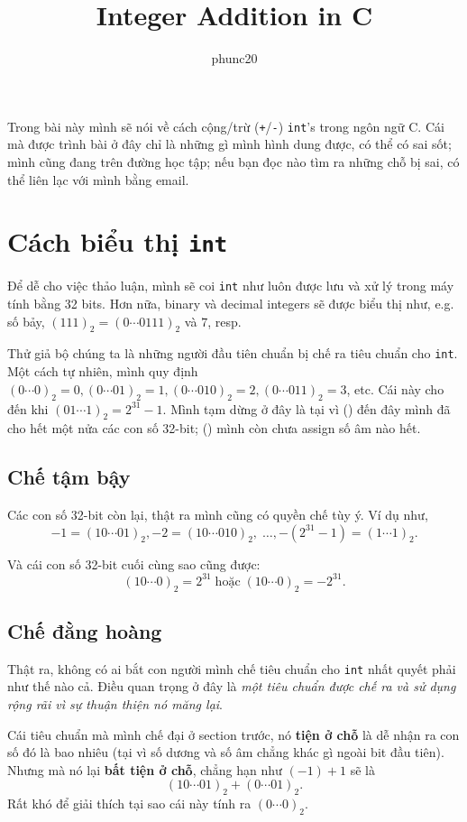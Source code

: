 \documentclass{article}
\author{phunc20}
\title{Integer Addition in C}
\begin{document}
\maketitle
Trong bài này mình sẽ nói về cách cộng/trừ (\texttt{+}/\texttt{-}) \texttt{int}'s trong ngôn ngữ C. Cái mà được trình bài ở đây chỉ là những gì mình hình dung được, có thể có sai sốt; mình cũng đang trên đường học tập; nếu bạn đọc nào tìm ra những chỗ bị sai, có thể liên lạc với mình bằng email.

\section{Cách biểu thị \texttt{int}}
Để dễ cho việc thảo luận, mình sẽ coi \texttt{int} như luôn được lưu và xử lý trong máy tính bằng 32 bits. Hơn nữa, binary và decimal integers sẽ được biểu thị như, e.g. số bảy, $(111)_{2} = (0\cdots0111)_{2}$ và $7$, resp.

Thử giả bộ chúng ta là những người đầu tiên chuẩn bị chế ra tiêu chuẩn cho \texttt{int}.
Một cách tự nhiên, mình quy định $(0\cdots0)_{2} = 0, (0\cdots01)_{2} = 1, (0\cdots010)_{2} = 2, (0\cdots011)_{2} = 3$, etc. Cái này cho đến khi $(01\cdots1)_{2} = 2^{31} - 1$. Mình tạm dừng ở đây là tại vì () đến đây mình đã cho hết một nửa các con số 32-bit; () mình còn chưa assign số âm nào hết.
\subsection{Chế tậm bậy}
Các con số 32-bit còn lại, thật ra mình cũng có quyền chế tùy ý. Ví dụ như, 
$$-1 = (10\cdots01)_{2}, -2 = (10\cdots010)_{2},\;\ldots, -(2^{31} - 1) = (1\cdots1)_{2}.$$

Và cái con số 32-bit cuối cùng sao cũng được:
$$(10\cdots0)_{2} = 2^{31} \;\textrm{hoặc}\; (10\cdots0)_{2} = -2^{31}.$$

\subsection{Chế đằng hoàng}
Thật ra, không có ai bắt con người mình chế tiêu chuẩn cho \texttt{int} nhất quyết phải như thế nào cả. Điều quan trọng ở đây là \textit{một tiêu chuẩn được chế ra và sử dụng rộng rãi vì sự thuận thiện nó măng lại}.
\vfil \break

Cái tiêu chuẩn mà mình chế đại ở section trước, nó \textbf{tiện ở chỗ} là dễ nhận ra con số đó là bao nhiêu (tại vì số dương và số âm chẳng khác gì ngoài bit đầu tiên). Nhưng mà nó lại \textbf{bất tiện ở chỗ}, chẳng hạn như $(-1) + 1$ sẽ là
$$(10\cdots01)_{2} + (0\cdots01)_{2}.$$
Rất khó để giải thích tại sao cái này tính ra $(0\cdots0)_{2}$.
\end{document}
